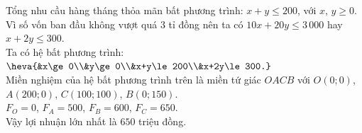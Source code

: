 \begin{ex}
{\begin{itemchoice}
			Tổng nhu cầu hàng tháng thỏa  mãn bất phương trình: $x+y\le 200$, với $x,\,y\ge 0$.\\
			Vì số vốn ban đầu không vượt quá $3$ tỉ đồng nên ta có  $10x+20y\le 3\,000$ hay $x+2y\le 300$.\\
			Ta có hệ bất  phương trình: $\heva{&x\ge 0\\&y\ge 0\\&x+y\le 200\\&x+2y\le 300.}$\\
			Miền nghiệm của hệ bất  phương trình trên là miền tứ giác $OACB$ với $O(0;0)$, $A(200;0)$, $C(100;100)$, $B(0;150)$.\\
			 $F_O=0$, $F_A=500$, $F_B=600$, $F_C=650$.\\
			Vậy lợi nhuận lớn nhất là $650$ triệu đồng. 
	\end{itemchoice}}
\end{ex}

